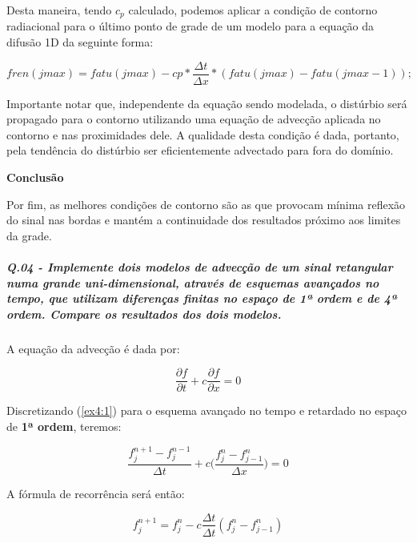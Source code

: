 \documentclass[11pt]{article}
\begin{document}
Desta maneira, tendo \(c_p\) calculado, podemos aplicar a condição de
contorno radiacional para o último ponto de grade de um modelo para a
equação da difusão 1D da seguinte forma:

\begin{equation}
    fren(jmax)=fatu(jmax) - cp*\frac{\Delta{t}}{\Delta{x}}*(fatu(jmax) - fatu(jmax-1));
\end{equation}

Importante notar que, independente da equação sendo modelada, o
distúrbio será propagado para o contorno utilizando uma equação de
advecção aplicada no contorno e nas proximidades dele. A qualidade desta
condição é dada, portanto, pela tendência do distúrbio ser
eficientemente advectado para fora do domínio.

\textbf{Conclusão}

Por fim, as melhores condições de contorno são as que provocam mínima
reflexão do sinal nas bordas e mantém a continuidade dos resultados
próximo aos limites da grade.

    \subparagraph{Q.04 - Implemente dois modelos de advecção de um sinal
retangular numa grande uni-dimensional, através de esquemas avançados no
tempo, que utilizam diferenças finitas no espaço de 1ª ordem e de 4ª
ordem. Compare os resultados dos dois
modelos.}\label{q.04---implemente-dois-modelos-de-advecuxe7uxe3o-de-um-sinal-retangular-numa-grande-uni-dimensional-atravuxe9s-de-esquemas-avanuxe7ados-no-tempo-que-utilizam-diferenuxe7as-finitas-no-espauxe7o-de-1uxaa-ordem-e-de-4uxaa-ordem.-compare-os-resultados-dos-dois-modelos.}

A equação da advecção é dada por:

\begin{equation}
    \frac{\partial{f}}{\partial{t}} + c\frac{\partial{f}}{\partial{x}} = 0
    \label{ex4:1}
\end{equation}

Discretizando (\ref{ex4:1}) para o esquema avançado no tempo e retardado
no espaço de \textbf{1ª ordem}, teremos:

\begin{equation}
    \frac{f^{n+1}_{j} - f^{n-1}_{j}}{\Delta{t}} + c\Biggl( \frac{f^{n}_{j} - f^{n}_{j-1}}{\Delta{x}} \Biggl) = 0
    \label{ex4:2}
\end{equation}

A fórmula de recorrência será então:

\begin{equation}
    f^{n+1}_{j} = f^{n}_{j} - c\frac{\Delta{t}}{\Delta{t}}(f^{n}_{j} - f^{n}_{j-1})
    \label{ex4:3}
\end{equation}
\end{document}
